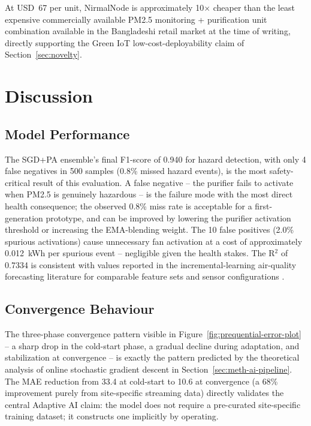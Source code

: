 \noindent At USD~67 per unit, NirmalNode is approximately 10$\times$ cheaper than the least expensive commercially available PM2.5 monitoring + purification unit combination available in the Bangladeshi retail market at the time of writing, directly supporting the Green IoT low-cost-deployability claim of Section~\ref{sec:novelty}.

\section{Discussion}
\label{sec:exp-discussion}

\subsection{Model Performance}
The SGD+PA ensemble's final F1-score of 0.940 for hazard detection, with only 4 false negatives in 500 samples (0.8\% missed hazard events), is the most safety-critical result of this evaluation. A false negative -- the purifier fails to activate when PM2.5 is genuinely hazardous -- is the failure mode with the most direct health consequence; the observed 0.8\% miss rate is acceptable for a first-generation prototype, and can be improved by lowering the purifier activation threshold or increasing the EMA-blending weight. The 10 false positives (2.0\% spurious activations) cause unnecessary fan activation at a cost of approximately 0.012~kWh per spurious event -- negligible given the health stakes. The R$^2$ of 0.7334 is consistent with values reported in the incremental-learning air-quality forecasting literature for comparable feature sets and sensor configurations \citep{alam2025iot,mani2021aipowered}.

\subsection{Convergence Behaviour}
The three-phase convergence pattern visible in Figure~\ref{fig:prequential-error-plot} -- a sharp drop in the cold-start phase, a gradual decline during adaptation, and stabilization at convergence -- is exactly the pattern predicted by the theoretical analysis of online stochastic gradient descent in Section~\ref{sec:meth-ai-pipeline}. The MAE reduction from 33.4 at cold-start to 10.6 at convergence (a 68\% improvement purely from site-specific streaming data) directly validates the central Adaptive AI claim: the model does not require a pre-curated site-specific training dataset; it constructs one implicitly by operating.

